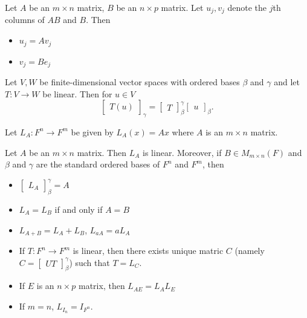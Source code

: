 \documentclass[12pt]{article}
\newenvironment{theorem}[2][Theorem]{\begin{trivlist}
\item[\hskip \labelsep {\bfseries #1}\hskip \labelsep {\bfseries #2.}]}{\end{trivlist}}
\begin{document}
\begin{theorem}{2.13}
Let $A$ be an $m \times n$ matrix, $B$ be an $n \times p$ matrix. Let $u_j, v_j$ denote the $j$th columns of $AB$ and $B$. Then 

\begin{itemize}
    \item[(a)] $u_j = Av_j$
    \item[(b)] $v_j = Be_j$
\end{itemize}
\end{theorem}

\begin{theorem}{2.14}
Let $V,W$ be finite-dimensional vector spaces with ordered bases $\beta$ and $\gamma$ and let $T : V \to W$ be linear. Then for $u \in V$ $$\begin{bmatrix} T(u) \end{bmatrix}_\gamma = \begin{bmatrix} T \end{bmatrix}_\beta^\gamma\begin{bmatrix} u \end{bmatrix}_\beta.$$
\end{theorem}

\noindent Let $L_A : F^n \to F^m$ be given by $L_A(x) = Ax$ where $A$ is an $m \times n$ matrix.

\begin{theorem}{2.15}
Let $A$ be an $m \times n$ matrix. Then $L_A$ is linear. Moreover, if $B \in M_{m \times n}(F)$ and $\beta$ and $\gamma$ are the standard ordered bases of $F^n$ and $F^m$, then

\begin{itemize}
    \item[(a)] $\begin{bmatrix} L_A \end{bmatrix}_\beta^\gamma = A$ 
    
    \item[(b)] $L_A = L_B$ if and only if $A = B$
    
    \item[(c)] $L_{A+B} = L_A + L_B$, $L_{aA} = aL_A$
    
    \item[(d)] If $T : F^n \to F^m$ is linear, then there exists unique matric $C$ (namely $C = \begin{bmatrix} UT \end{bmatrix}_\beta^\gamma$) such that $T = L_C$.
    
    \item[(e)] If $E$ is an $n \times p$ matrix, then $L_{AE} = L_AL_E$
    
    \item[(f)] If $m = n$, $L_{I_n} = I_{F^n}$.
\end{itemize}
\end{theorem}
\end{document}
